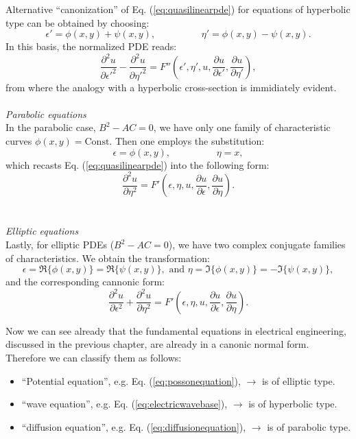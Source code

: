 Alternative ``canonization'' of Eq. (\ref{eq:quasilinearpde}) for equations of hyperbolic type can be obtained by choosing:
\begin{equation*}
  \epsilon' =\phi(x,y) + \psi(x,y), \hspace{2cm}  \eta' = \phi(x,y) - \psi(x,y).
\end{equation*} 
In this basis, the normalized PDE reads:
\begin{equation*}
  \frac{\partial^2 u}{\partial \epsilon'^2 } -\frac{\partial^2 u}{\partial \eta'^2 }  = F''(\epsilon',\eta',u,\frac{\partial u}{\partial \epsilon'},\frac{\partial u}{\partial \eta'}), 
\end{equation*} 
from where the analogy with a hyperbolic cross-section is immidiately evident.\\\\
\emph{Parabolic equations}\\
In the parabolic case, $B^2-AC = 0$, we have only one family of characteristic curves $\phi(x,y) = \text{Const}$. Then one employs the substitution:
\begin{equation*}
  \epsilon =  \phi(x,y), \hspace{2cm}  \eta = x, 
\end{equation*}
which recasts Eq. (\ref{eq:quasilinearpde}) into the following form:
\begin{equation*}
  \frac{\partial^2 u}{\partial \eta^2 } =  F'(\epsilon,\eta,u,\frac{\partial u}{\partial \epsilon},\frac{\partial u}{\partial \eta}).
\end{equation*}\\\\
\emph{Elliptic equations}\\
Lastly, for elliptic PDEs ($B^2-AC = 0$), we have two complex conjugate families of characteristics. We obtain the transformation:
\begin{equation*}
  \epsilon =  \Re\{ {\phi(x,y)} \} = \Re\{ {\psi(x,y)} \}, \text{ and }  \eta = \Im \{ {\phi(x,y)} \} = - \Im\{ {\psi(x,y)} \},
\end{equation*}
and the corresponding cannonic form:
\begin{equation*}
  \frac{\partial^2 u}{\partial \epsilon^2 } +   \frac{\partial^2 u}{\partial \eta^2 } =  F'(\epsilon,\eta,u,\frac{\partial u}{\partial \epsilon},\frac{\partial u}{\partial \eta}).
\end{equation*}

Now we can see already that the fundamental equations in electrical engineering, discussed in the previous chapter, are already in a canonic normal form. Therefore we can classify them as follows:
\begin{itemize}
  \item ``Potential equation'', e.g. Eq. (\ref{eq:possonequation}), $\rightarrow$ is of elliptic type. 
  \item ``wave equation'', e.g. Eq. (\ref{eq:electricwavebase}), $\rightarrow$ is of hyperbolic type.
  \item ``diffusion equation'', e.g. Eq. (\ref{eq:diffusionequation}),  $\rightarrow$ is of parabolic type.
\end{itemize}

